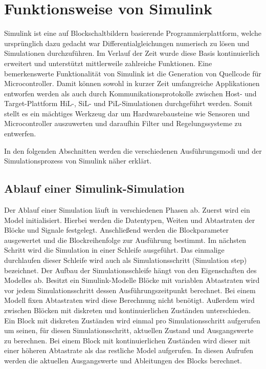 \section{Funktionsweise von Simulink}
Simulink ist eine auf Blockschaltbildern basierende Programmierplattform, welche ursprünglich dazu gedacht war Differentialgleichungen numerisch zu lösen und Simulationen durchzuführen. Im Verlauf der Zeit wurde diese Basis kontinuierlich erweitert und unterstützt mittlerweile zahlreiche Funktionen. Eine bemerkenswerte Funktionalität von Simulink ist die Generation von Quellcode für Microcontroller. Damit können sowohl in kurzer Zeit umfangreiche Applikationen entworfen werden als auch durch Kommunikationsprotokolle zwischen Host- und Target-Plattform HiL-, SiL- und PiL-Simulationen durchgeführt werden. Somit stellt es ein mächtiges Werkzeug dar um Hardwarebausteine wie Sensoren und Microcontroller auszuwerten und daraufhin Filter und Regelungssysteme zu entwerfen.

In den folgenden Abschnitten werden die verschiedenen Ausführungsmodi und der Simulationsprozess von Simulink näher erklärt.

\subsection{Ablauf einer Simulink-Simulation}
Der Ablauf einer Simulation läuft in verschiedenen Phasen ab. Zuerst wird ein Model initialisiert. Hierbei werden die Datentypen, Weiten und Abtastraten der Blöcke und Signale festgelegt. Anschließend werden die Blockparameter ausgewertet und die Blockreihenfolge zur Ausführung bestimmt. Im nächsten Schritt wird die Simulation in einer Schleife ausgeführt. Das einmalige durchlaufen dieser Schleife wird auch als Simulationsschritt (Simulation step) bezeichnet. Der Aufbau der Simulationsschleife hängt von den Eigenschaften des Modelles ab. Besitzt ein Simulink-Modelle Blöcke mit variablen Abtastraten wird vor jedem Simulationsschritt dessen Ausführungszeitpunkt berechnet. Bei einem Modell fixen Abtastraten wird diese Berechnung nicht benötigt. Außerdem wird zwischen Blöcken mit diskreten und kontinuierlichen Zuständen unterschieden. Ein Block mit diskreten Zuständen wird einmal pro Simulationsschritt aufgerufen um seinen, für diesen Simulationsschritt, aktuellen Zustand und Ausgangswerte zu berechnen. Bei einem Block mit kontinuierlichen Zuständen wird dieser mit einer höheren Abtastrate als das restliche Model aufgerufen. In diesen Aufrufen werden die aktuellen Ausgangswerte und Ableitungen des Blocks berechnet.

